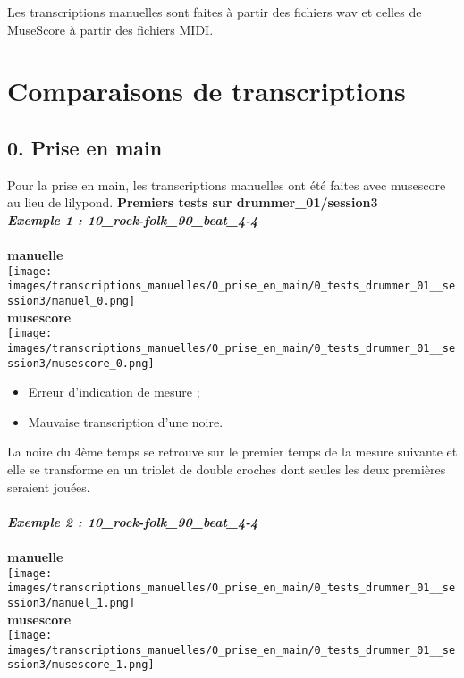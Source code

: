 Les transcriptions manuelles sont faites à partir des fichiers wav et celles de MuseScore à partir des fichiers MIDI.\\
\section{Comparaisons de transcriptions}
\subsection*{0. Prise en main}
Pour la prise en main, les transcriptions manuelles ont été faites avec musescore au lieu de lilypond.
\textbf{Premiers tests sur drummer\_01/session3}\\

\textbf{\textit{Exemple 1 : 10\_rock-folk\_90\_beat\_4-4}}\\\\
\textbf{manuelle}\\
\texttt{[image: images/transcriptions\_manuelles/0\_prise\_en\_main/0\_tests\_drummer\_01\_\_session3/manuel\_0.png]} \\
\textbf{musescore}\\
\texttt{[image: images/transcriptions\_manuelles/0\_prise\_en\_main/0\_tests\_drummer\_01\_\_session3/musescore\_0.png]} \\
\begin{itemize}
	\item Erreur d’indication de mesure ;
	\item Mauvaise transcription d’une noire.\\
\end{itemize}
La noire du 4ème temps se retrouve sur le premier temps de la mesure suivante et elle se transforme en un triolet de double croches dont seules les deux premières seraient jouées.\\\\
\textbf{\textit{Exemple 2 : 10\_rock-folk\_90\_beat\_4-4}}\\\\
\textbf{manuelle}\\
\texttt{[image: images/transcriptions\_manuelles/0\_prise\_en\_main/0\_tests\_drummer\_01\_\_session3/manuel\_1.png]} \\
\textbf{musescore}\\
\texttt{[image: images/transcriptions\_manuelles/0\_prise\_en\_main/0\_tests\_drummer\_01\_\_session3/musescore\_1.png]} \\
